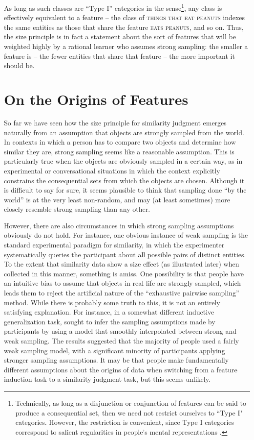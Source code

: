 \documentclass{apa}
\newcommand{\feature}[1]{\textsc{#1}}
\begin{document}
As long as such classes are ``Type I'' categories in the  sense\footnote{Technically, as long as a disjunction or conjunction of features can be said to produce a consequential set, then we need not restrict ourselves to ``Type I" categories. However, the restriction is convenient, since Type I categories correspond to salient regularities in people's mental representations \cite{Shepard1961}.}, any class is effectively equivalent to a feature -- the class of \feature{things that eat peanuts} indexes the same entities as those that share the feature \feature{eats peanuts}, and so on. Thus, the size principle is in fact a statement about the sort of features that will be weighted highly by a rational learner who assumes strong sampling: the smaller a feature is -- the fewer entities that share that feature -- the more important it should be.

\section{On the Origins of Features}

So far we have seen how the size principle for similarity judgment emerges naturally from an assumption that objects are strongly sampled from the world. In contexts in which a person has to compare two objects and determine how similar they are, strong sampling seems like a reasonable assumption.  This is particularly true when the objects are obviously sampled in a certain way, as in experimental or conversational situations in which the context explicitly constrains the consequential sets from which the objects are chosen. Although it is difficult to say for sure, it seems plausible to think that sampling done ``by the world'' is at the very least non-random, and may (at least sometimes) more closely resemble strong sampling than any other.

However, there are also circumstances in which strong sampling assumptions obviously do not hold. For instance, one obvious instance of weak sampling is the standard experimental paradigm for similarity, in which the experimenter systematically queries the participant about all possible pairs of distinct entities. To the extent that similarity data show a size effect (as illustrated later) when collected in this manner, something is amiss. One possibility is that people have an intuitive bias to assume that objects in real life are strongly sampled, which leads them to reject the artificial nature of the ``exhaustive pairwise sampling'' method.
While there is probably some truth to this, it is not an entirely satisfying explanation. For instance, in a somewhat different inductive generalization task,  sought to infer the sampling assumptions made by participants by using a model that smoothly interpolated between strong and weak sampling. The results suggested that the majority of people used a fairly weak sampling model, with a significant minority of participants applying stronger sampling assumptions. It may be that people make fundamentally different assumptions about the origins of data when switching from a feature induction task to a similarity judgment task, but this seems unlikely.
\end{document}
